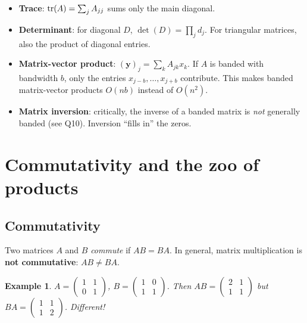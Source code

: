 \documentclass[11pt,a4paper]{article}
\newtheorem{example}[theorem]{Example}
\begin{document}
\begin{itemize}[nosep]
  \item \textbf{Trace}: $\tr(A) = \sum_j A_{jj}$ sums only the main diagonal.  
  \item \textbf{Determinant}: for diagonal $D$, $\det(D) = \prod_j d_j$.  For triangular matrices, also the product of diagonal entries.
  \item \textbf{Matrix-vector product}: $(\mathbf{y})_j = \sum_k A_{jk} x_k$.  If $A$ is banded with bandwidth $b$, only the entries $x_{j-b}, \dots, x_{j+b}$ contribute.  This makes banded matrix-vector products $O(nb)$ instead of $O(n^2)$.
  \item \textbf{Matrix inversion}: critically, the inverse of a banded matrix is \emph{not} generally banded (see Q10).  Inversion ``fills in'' the zeros.
\end{itemize}


\section{Commutativity and the zoo of products}
\label{sec:q8}

\subsection{Commutativity}

Two matrices $A$ and $B$ \emph{commute} if $AB = BA$.  In general, matrix multiplication is \textbf{not commutative}: $AB \neq BA$.

\begin{example}
$A = \begin{pmatrix} 1 & 1 \\ 0 & 1 \end{pmatrix}$, $B = \begin{pmatrix} 1 & 0 \\ 1 & 1 \end{pmatrix}$.  Then $AB = \begin{pmatrix} 2 & 1 \\ 1 & 1 \end{pmatrix}$ but $BA = \begin{pmatrix} 1 & 1 \\ 1 & 2 \end{pmatrix}$.  Different!
\end{example}
\end{document}
